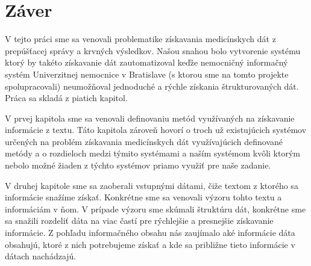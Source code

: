 \chapter*{Záver}  %





V tejto práci sme sa venovali problematike získavania medicínskych dát z prepúšťacej správy a krvných výsledkov. Našou snahou bolo vytvorenie systému ktorý by takéto získavanie dát zautomatizoval keďže nemocničný informačný systém Univerzitnej nemocnice v Bratislave (s ktorou sme na tomto projekte spolupracovali) neumožňoval jednoduché a rýchle získania štrukturovaných dát. Práca sa skladá z piatich kapitol. 

V prvej kapitola sme sa venovali definovaniu metód využívaných na získavanie informácie z textu. Táto kapitola zároveň hovorí o troch už existujúcich systémov určených na problém získavania medicínskych dát využívajúcich definované metódy a o rozdieloch medzi týmito systémami a naším systémom kvôli ktorým nebolo možné žiaden z týchto systémov priamo využiť pre naše zadanie.

V druhej kapitole sme sa zaoberali vstupnými dátami, čiže textom z ktorého sa informácie snažíme získať. Konkrétne sme sa venovali výzoru tohto textu a informáciám v ňom. V prípade výzoru sme skúmali štruktúru dát, konkrétne sme sa snažili rozdeliť dáta na viac častí pre rýchlejšie a presnejšie získavanie informácie. Z pohľadu informačného obsahu nás zaujímalo aké informácie dáta obsahujú, ktoré z nich potrebujeme získať a kde sa približne tieto informácie v dátach nachádzajú.   

